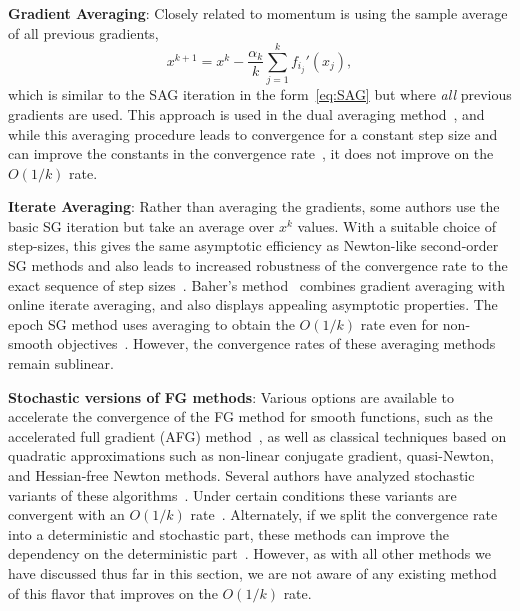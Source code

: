 \documentclass{article}
\begin{document}
\textbf{Gradient Averaging}:
Closely related to momentum is using the sample average of all previous
gradients,
\[
\textstyle
x^{k+1} = x^k - \frac{\alpha_k}{k}\sum_{j=1}^kf_{i_j}'(x_j),
\]
which is similar to the SAG iteration in the form~\eqref{eq:SAG} but where \emph{all} previous
gradients are used.
This approach is used in the dual averaging method~\cite{nesterov2009primal}, and while this averaging procedure 
leads to convergence for a constant step size and 
can improve the constants in the convergence rate~\cite{xiao2010dual}, it does not improve on the $O(1/k)$ rate.

\textbf{Iterate Averaging}: Rather than averaging the gradients, some authors use the basic SG iteration but take an average over $x^k$ values.
With a suitable choice of step-sizes, this gives the same asymptotic efficiency as Newton-like second-order SG methods and also leads to increased robustness of the convergence rate to the exact sequence of step sizes~\cite{polyak1992acceleration}.  Baher's method~\cite[\S1.3.4]{kushner1997stochastic} combines gradient averaging with online iterate averaging, and also displays appealing asymptotic properties.  
The epoch SG method uses averaging to obtain the $O(1/k)$ rate even for non-smooth objectives~\cite{hazan2010beyond}. 
However, the convergence rates of these averaging methods remain sublinear.

\textbf{Stochastic versions of FG methods}: Various options are available to accelerate the convergence of the FG method for smooth functions, such as the accelerated full gradient (AFG) method~\cite{nesterov1983method}, as well as classical techniques based on quadratic approximations such as non-linear conjugate gradient, quasi-Newton, and Hessian-free Newton methods.
Several authors have analyzed stochastic variants of these algorithms~\cite{schraudolph1999local,sunehag2009variable,ghadimi2010optimal,martens2010deep,xiao2010dual}. Under certain conditions these variants are convergent with an $O(1/k)$ rate~\cite{sunehag2009variable}.  Alternately, if we split the convergence rate into a deterministic and stochastic part, these methods can improve the dependency on the deterministic part~\cite{ghadimi2010optimal,xiao2010dual}.  However, as with all other methods we have discussed thus far in this section, we are not aware of any existing method of this flavor that improves on the $O(1/k)$ rate.
\end{document}
